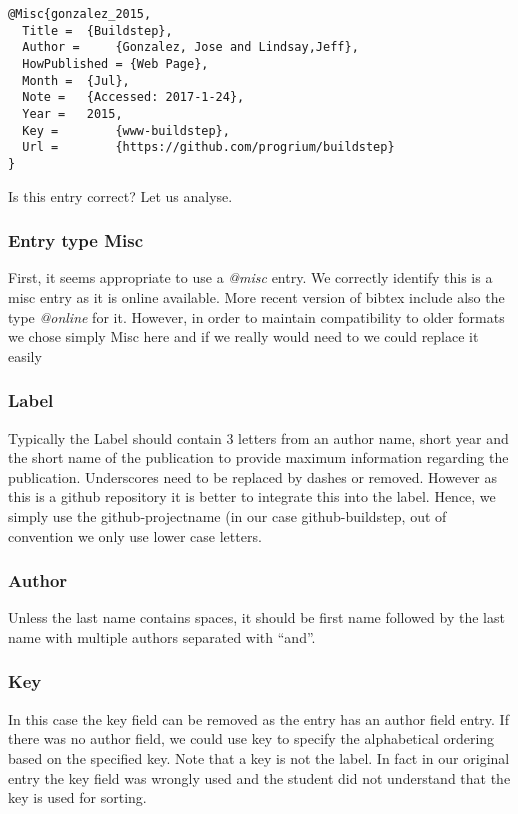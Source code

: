 \begin{verbatim}
@Misc{gonzalez_2015,
  Title =  {Buildstep},
  Author =     {Gonzalez, Jose and Lindsay,Jeff},
  HowPublished = {Web Page},
  Month =  {Jul},
  Note =   {Accessed: 2017-1-24},
  Year =   2015,
  Key =        {www-buildstep},
  Url =        {https://github.com/progrium/buildstep}
}
\end{verbatim}

Is this entry correct? Let us analyse.

\subsubsection{Entry type Misc}\label{entry-type-misc}

First, it seems appropriate to use a \emph{@misc} entry. We correctly
identify this is a misc entry as it is online available. More recent
version of bibtex include also the type \emph{@online} for it. However,
in order to maintain compatibility to older formats we chose simply Misc
here and if we really would need to we could replace it easily

\subsubsection{Label}\label{label}

Typically the Label should contain 3 letters from an author name, short
year and the short name of the publication to provide maximum
information regarding the publication. Underscores need to be replaced
by dashes or removed. However as this is a github repository it is
better to integrate this into the label. Hence, we simply use the
github-projectname (in our case github-buildstep, out of convention we
only use lower case letters.

\subsubsection{Author}\label{author}

Unless the last name contains spaces, it should be first name followed
by the last name with multiple authors separated with ``and''.

\subsubsection{Key}\label{key}

In this case the key field can be removed as the entry has an author
field entry. If there was no author field, we could use key to specify
the alphabetical ordering based on the specified key. Note that a key is
not the label. In fact in our original entry the key field was wrongly
used and the student did not understand that the key is used for
sorting.

